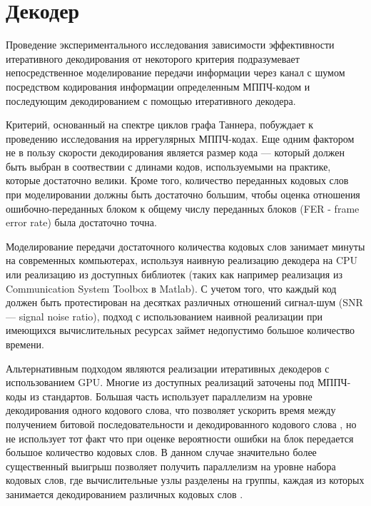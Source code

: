 \chapter{Декодер}

\cite{hall-combinatorics,kudryashov-codingtheory,finding-and-counting-given-length-cycles,counting-short-cycles-of-quasi-cyclic-protograph-ldpc-codes,message-passing-algorithm-for-counting-short-cycles-in-graph,how-to-find-long-paths-efficiently,color-coding,algorithm-for-counting-for-counting-short-cycles-in-bipartite-graphs,on-the-number-of-cycles-in-a-graph,understanding-belief-propogation,mackay-codes}
Проведение экспериментального исследования зависимости эффективности итеративного декодирования от некоторого
критерия подразумевает непосредственное моделирование передачи информации через канал с шумом посредством 
кодирования информации определенным МППЧ-кодом и последующим декодированием с помощью итеративного декодера.

Критерий, основанный на спектре циклов графа Таннера, побуждает к проведению исследования на иррегулярных
МППЧ-кодах. Еще одним фактором не в пользу скорости декодирования является размер кода --- который
должен быть выбран в соотвествии с длинами кодов, используемыми на практике, которые достаточно велики.
Кроме того, количество переданных кодовых слов при моделировании должны быть достаточно большим, чтобы оценка
отношения ошибочно-переданных блоком к общему числу переданных блоков (FER - frame error rate) была достаточно точна.

Моделирование передачи достаточного количества кодовых слов занимает минуты на современных 
компьютерах, используя наивную реализацию декодера на CPU или реализацию из доступных библиотек 
(таких как например реализация из Communication System Toolbox в Matlab). 
С учетом того, что каждый код должен быть протестирован на десятках различных отношений сигнал-шум (SNR ---
signal noise ratio), подход с использованием наивной реализации при имеющихся вычислительных ресурсах займет
недопустимо большое количество времени. 

Альтернативным подходом являются реализации итеративных декодеров с использованием
GPU.
Многие из доступных реализаций заточены под МППЧ-коды из стандартов. Большая часть использует параллелизм
на уровне декодирования одного кодового слова, что позволяет ускорить время между получением 
битовой последовательности и декодированного кодового слова
\cite{stressing-the-ber-simulation-of-ldpc-codes-in-the-error-floor-region-using-gpu-clusters}, 
но не использует тот факт что при оценке вероятности ошибки на блок передается большое количество кодовых
слов. В данном случае значительно более существенный выигрыш позволяет получить параллелизм
на уровне набора кодовых слов, где вычислительные узлы разделены на группы, каждая из которых занимается
декодированием различных кодовых слов
\cite{opencl-cuda-algorithms-for-parallel-decoding-of-any-irregular-ldpc-code-using-gpu}.


